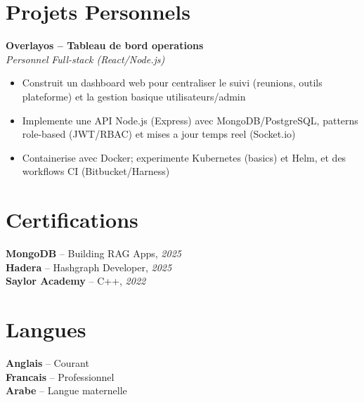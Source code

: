 \documentclass[10pt,a4paper]{article}
\begin{document}
\vspace{4pt}
\section*{Projets Personnels}
{\small
\textbf{Overlayos -- Tableau de bord operations}\\[1pt]
\textit{Personnel} \hfill \textit{Full-stack (React/Node.js)}
\begin{itemize}
  \item Construit un dashboard web pour centraliser le suivi (reunions, outils plateforme) et la gestion basique utilisateurs/admin
  \item Implemente une API Node.js (Express) avec MongoDB/PostgreSQL, patterns role-based (JWT/RBAC) et mises a jour temps reel (Socket.io)
  \item Containerise avec Docker; experimente Kubernetes (basics) et Helm, et des workflows CI (Bitbucket/Harness)
\end{itemize}

}

\vspace{3pt}
\section*{Certifications}
{\small
\textbf{MongoDB} -- Building RAG Apps, \textit{2025}\\[1pt]
\textbf{Hadera} -- Hashgraph Developer, \textit{2025}\\[1pt]
\textbf{Saylor Academy} -- C++, \textit{2022}
}

\section*{Langues}
{\small
\textbf{Anglais} -- Courant\\[1pt]
\textbf{Francais} -- Professionnel\\[1pt]
\textbf{Arabe} -- Langue maternelle
}
\end{document}
